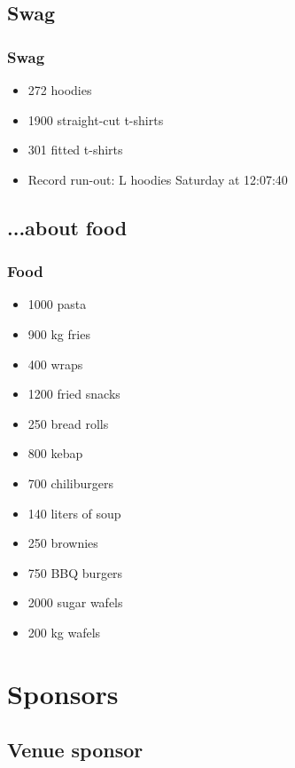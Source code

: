 \documentclass[aspectratio=169]{beamer}
\begin{document}
\subsection{Swag}

\begin{frame}
	\frametitle{Swag}
	\vfill
	\begin{itemize}
		\item 272 hoodies
		\item 1900 straight-cut t-shirts
		\item 301 fitted t-shirts
		\item Record run-out: L hoodies Saturday at 12:07:40
	\end{itemize}
	\vfill
\end{frame}

\subsection{...about food}

\begin{frame}
	\frametitle{Food}
	\vfill
	\begin{itemize}
		\item 1000 pasta
		\item 900 kg fries
		\item 400 wraps
		\item 1200 fried snacks 
		\item 250 bread rolls
		\item 800 kebap
		\item 700 chiliburgers
		\item 140 liters of soup
		\item 250 brownies
		\item 750 BBQ burgers
		\item 2000 sugar wafels
		\item 200 kg wafels 
	\end{itemize}
	\vfill
\end{frame}

\section{Sponsors}


\subsection{Venue sponsor}
\end{document}
